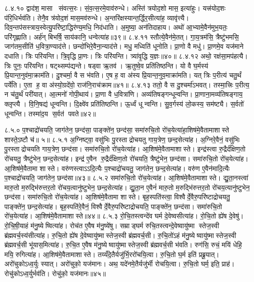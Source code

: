 ८.४.१०
द्वाद॑श॒ मासा संवत्स॒रः। सं॒व॒त्स॒रमे॒वाव॑रुन्धे। अस्ति॑ त्रयोद॒शो मास॒ इत्या॑हुः। यत्त्र॑योद॒शः प॑रि॒धिर्भव॑ति। तेनै॒व त्र॑योद॒शं मास॒मव॑रुन्धे। अ॒न्तरि॑क्षस्यान्त॒र्द्धिर॒सीत्या॑ह॒ व्यावृ॑त्त्यै। दिव॒न्तप॑सस्त्राय॒स्वेत्यु॒परि॑ष्टा॒द्धिर॑ण्य॒मधि॒ निद॑धाति। अ॒मुष्या॒ अन॑तिदाहाय। अथो॑ आ॒भ्यामे॒वैन॑मुभ॒यतः॒ परि॑गृह्णाति। अर्\mbox{}ह॑न् बिभर्\mbox{}षि॒ साय॑कानि॒ धन्वेत्या॑ह॥३९॥
८.४.११
स्तौत्ये॒वैन॑मे॒तत्। गा॒य॒त्रम॑सि॒ त्रैष्टु॑भमसि॒ जाग॑तम॒सीति॑ ध॒वित्रा॒ण्याद॑त्ते। छन्दो॑भिरे॒वैना॒न्याद॑त्ते। मधु॒ मध्विति॑ धूनोति। प्रा॒णो वै मधु॑। प्रा॒णमे॒व यज॑माने दधाति। त्रिः परि॑यन्ति। त्रि॒वृद्धि प्रा॒णः। त्रिः परि॑यन्ति। त्र्या॑वृ॒द्धि य॒ज्ञः॥४०॥
८.४.१२
अथो॒ रक्ष॑सा॒मप॑हत्यै। त्रिः पुनः॒ परि॑यन्ति। षट्थ्सम्प॑द्यन्ते। षड्वा ऋ॒तव॑। ऋ॒तुष्वे॒व प्रति॑तिष्ठन्ति। यो वै घ॒र्मस्य॑ प्रि॒यान्त॒नुव॑मा॒क्राम॑ति। दु॒श्चर्मा॒ वै स भ॑वति। ए॒ष ह॒ वा अ॑स्य प्रि॒यान्त॒नुव॒माक्रा॑मति। यत् त्रिः प॒रीत्य॑ चतु॒र्थं पर्ये॑ति। ए॒ता ह॒ वा अ॑स्यो॒ग्रदे॑वो॒ राज॑नि॒राच॑क्राम॥४१॥
८.४.१३
ततो॒ वै स दु॒श्चर्मा॑ऽभवत्। तस्मा॒त्त्रिः प॒रीत्य॒ न च॑तु॒र्थं परी॑यात्। आ॒त्मनो॑ गोपी॒थाय॑। प्रा॒णा वै ध॒वित्रा॑णि। अव्य॑तिषङ्गन्धून्वन्ति। प्रा॒णाना॒मव्य॑तिषङ्गाय॒ क्लृप्त्यै। वि॒नि॒षद्य॑ धून्वन्ति। दि॒क्ष्वे॑व प्रति॑तिष्ठन्ति। ऊ॒र्ध्वं धून्वन्ति। सु॒व॒र्गस्य॑ लो॒कस्य॒ सम॑ष्ट्यै। स॒र्वतो॑ धून्वन्ति। तस्मा॑द॒य स॒र्वत॑ पवते॥४२॥
\anuvakamend

८.५.०
प॒श्चाद्रो॑चयति॒ जाग॑तेन॒ छन्द॑सा॒ पाङ्क्ते॑न॒ छन्द॑सा॒ समा॑रुचि॒तो रो॑च॒येत्या॑हा॒शिष॑मे॒वैतामाशास्ते शास्ते॒ऽष्टौ च॑॥ ५॥
८.५.१
अ॒ग्निष्ट्वा॒ वसु॑भिः पु॒रस्ताद्रोचयतु गाय॒त्रेण॒ छन्द॒सेत्या॑ह। अ॒ग्निरे॒वैनं॒ वसु॑भिः पु॒रस्ताद्रोचयति गाय॒त्रेण॒ छन्द॑सा। समा॑रुचि॒तो रो॑च॒येत्या॑ह। आ॒शिष॑मे॒वैतामाशास्ते। इन्द्र॑स्त्वा रु॒द्रैर्द॑क्षिण॒तो रो॑चयतु॒ त्रैष्टु॑भेन॒ छन्द॒सेत्या॑ह। इन्द्र॑ ए॒वैन रु॒द्रैर्द॑क्षिण॒तो रो॑चयति॒ त्रैष्टु॑भेन॒ छन्द॑सा। समा॑रुचि॒तो रो॑च॒येत्या॑ह। आ॒शिष॑मे॒वैतामा शास्ते। वरु॑णस्त्वाऽऽदि॒त्यैः प॒श्चाद्रो॑चयतु॒ जाग॑तेन॒ छन्द॒सेत्या॑ह। वरु॑ण ए॒वैन॑मादि॒त्यैः प॒श्चाद्रो॑चयति॒ जाग॑तेन॒ छन्द॑सा॥४३॥
८.५.२
समा॑रुचि॒तो रो॑च॒येत्या॑ह। आ॒शिष॑मे॒वैतामाशास्ते। द्यु॒ता॒नस्त्वा॑ मारु॒तो म॒रुद्भि॑रुत्तर॒तो रो॑चय॒त्वानु॑ष्टुभेन॒ छन्द॒सेत्या॑ह। द्यु॒ता॒न ए॒वैनं॑ मारु॒तो म॒रुद्भि॑रुत्तर॒तो रो॑चय॒त्यानु॑ष्टुभेन॒ छन्द॑सा। समा॑रुचि॒तो रो॑च॒येत्या॑ह। आ॒शिष॑मे॒वैतामा शास्ते। बृह॒स्पति॑स्त्वा॒ विश्वैर्दे॒वैरु॒परि॑ष्टाद्रोचयतु॒ पाङ्क्ते॑न॒ छन्द॒सेत्या॑ह। बृह॒स्पति॑रे॒वैनं॒  विश्वैर्दे॒वैरु॒परि॑ष्टाद्रोचयति॒ पाङ्क्ते॑न॒ छन्द॑सा। समा॑रुचि॒तो रो॑च॒येत्या॑ह। आ॒शिष॑मे॒वैतामाशास्ते॥४४॥
८.५.३
रो॒चि॒तस्त्वन्दे॑व घर्म दे॒वेष्वसीत्या॑ह। रो॒चि॒तो ह्ये॑ष दे॒वेषु॑। रो॒चि॒षी॒याहं म॑नु॒ष्येष्वित्या॑ह। रोच॑त ए॒वैष म॑नु॒ष्ये॑षु। सम्राड्घर्म रुचि॒तस्त्वन्दे॒वेष्वायु॑ष्मा स्तेज॒स्वी ब्र॑ह्मवर्च॒स्य॑सीत्या॑ह। रु॒चि॒तो ह्ये॑ष दे॒वेष्वायु॑ष्मास्तेज॒स्वी ब्र॑ह्मवर्च॒सी। रु॒चि॒तो॑ऽहं म॑नु॒ष्येष्वायु॑ष्मास्तेज॒स्वी ब्र॑ह्मवर्च॒सी भू॑यास॒मित्या॑ह। रु॒चि॒त ए॒वैष म॑नु॒ष्येष्वायु॑ष्मास्तेज॒स्वी ब्र॑ह्मवर्च॒सी भ॑वति। रुग॑सि॒ रुचं॒ मयि॑ धेहि॒ मयि॒ रुगित्या॑ह। आ॒शिष॑मे॒वैतामाशास्ते। तय्यँदे॒तैर्यजु॑र्भि॒ररो॑चयि॒त्वा। रु॒चि॒तो घ॒र्म इति॑ प्रब्रू॒यात्। अरो॑चुकोऽध्व॒र्युः स्यात्। अरो॑चुको॒ यज॑मानः। अथ॒ यदे॑नमे॒तैर्यजु॑र्भी रोचयि॒त्वा। रु॒चि॒तो घर्म॒ इति॒ प्राह॑। रोचु॑कोऽध्व॒र्युर्भव॑ति। रोचु॑को॒ यज॑मानः॥४५॥
\anuvakamend


